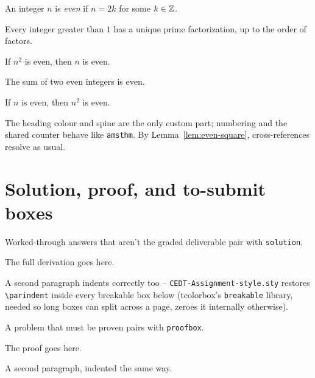 \documentclass[a4paper, 10pt]{article}
\begin{document}
\begin{definition}
	An integer $n$ is \emph{even} if $n = 2k$ for some $k \in \mathbb{Z}$.
\end{definition}

\begin{theorem}
	Every integer greater than $1$ has a unique prime factorization, up to the
	order of factors.
\end{theorem}

\begin{lemma}\label{lem:even-square}
	If $n^2$ is even, then $n$ is even.
\end{lemma}

\begin{proposition}
	The sum of two even integers is even.
\end{proposition}

\begin{corollary}
	If $n$ is even, then $n^2$ is even.
\end{corollary}

\begin{remark}
	The heading colour and spine are the only custom part; numbering and the
	shared counter behave like \texttt{amsthm}. By Lemma~\ref{lem:even-square},
	cross-references resolve as usual.
\end{remark}

\section{Solution, proof, and to-submit boxes}
\begin{problem}
Worked-through answers that aren't the graded deliverable pair with
\verb|solution|.
\end{problem}
\begin{solution}
	The full derivation goes here.

	A second paragraph indents correctly too -- \texttt{CEDT-Assignment-style.sty}
	restores \verb|\parindent| inside every breakable box below (tcolorbox's
	\texttt{breakable} library, needed so long boxes can split across a page,
	zeroes it internally otherwise).
\end{solution}

\begin{problem}
A problem that must be proven pairs with \verb|proofbox|.
\end{problem}
\begin{proofbox}
	The proof goes here.

	A second paragraph, indented the same way. \hfill\qedsymbol
\end{proofbox}
\end{document}
